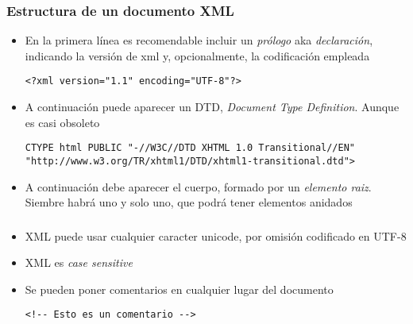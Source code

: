 \documentclass[ucs]{beamer}
\begin{document}
\begin{frame}[fragile]
\frametitle{Estructura de un documento XML}
\begin{itemize}

\item
En la primera línea es recomendable incluir un \emph{prólogo} aka \emph{declaración}, indicando
la versión de xml y, opcionalmente, la codificación empleada
  \begin{footnotesize}
  \begin{verbatim}
<?xml version="1.1" encoding="UTF-8"?>
  \end{verbatim}
  \end{footnotesize}

\item
A continuación puede aparecer un
DTD, \emph{Document Type Definition}. Aunque es casi obsoleto

  \begin{footnotesize}
  \begin{verbatim}
CTYPE html PUBLIC "-//W3C//DTD XHTML 1.0 Transitional//EN"
"http://www.w3.org/TR/xhtml1/DTD/xhtml1-transitional.dtd">
  \end{verbatim}
  \end{footnotesize}

\item
A continuación debe aparecer el cuerpo, formado por un
\emph{elemento raiz}. Siembre habrá
uno y solo uno, que podrá tener elementos anidados



\end{itemize}
\end{frame}
\begin{frame}[fragile]
\frametitle{}
\begin{itemize}

\item
XML puede usar cualquier caracter unicode, por omisión codificado en UTF-8

\item
XML es \emph{case sensitive}

\item
Se pueden poner comentarios en cualquier lugar del documento
  \begin{footnotesize}
  \begin{verbatim}
<!-- Esto es un comentario -->
  \end{verbatim}
  \end{footnotesize}
\end{itemize}

\end{frame}
\end{document}

